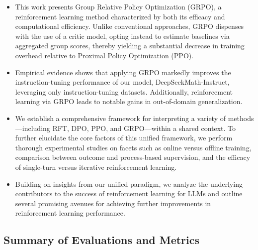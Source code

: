 \begin{itemize}[topsep=0pt]
    \item This work presents Group Relative Policy Optimization (GRPO), a reinforcement learning method characterized by both its efficacy and computational efficiency. Unlike conventional approaches, GRPO dispenses with the use of a critic model, opting instead to estimate baselines via aggregated group scores, thereby yielding a substantial decrease in training overhead relative to Proximal Policy Optimization (PPO).
    \item Empirical evidence shows that applying GRPO markedly improves the instruction-tuning performance of our model, DeepSeekMath-Instruct, leveraging only instruction-tuning datasets. Additionally, reinforcement learning via GRPO leads to notable gains in out-of-domain generalization.
    \item We establish a comprehensive framework for interpreting a variety of methods—including RFT, DPO, PPO, and GRPO—within a shared context. To further elucidate the core factors of this unified framework, we perform thorough experimental studies on facets such as online versus offline training, comparison between outcome and process-based supervision, and the efficacy of single-turn versus iterative reinforcement learning.
    \item Building on insights from our unified paradigm, we analyze the underlying contributors to the success of reinforcement learning for LLMs and outline several promising avenues for achieving further improvements in reinforcement learning performance.
\end{itemize}

\subsection{Summary of Evaluations and Metrics}

